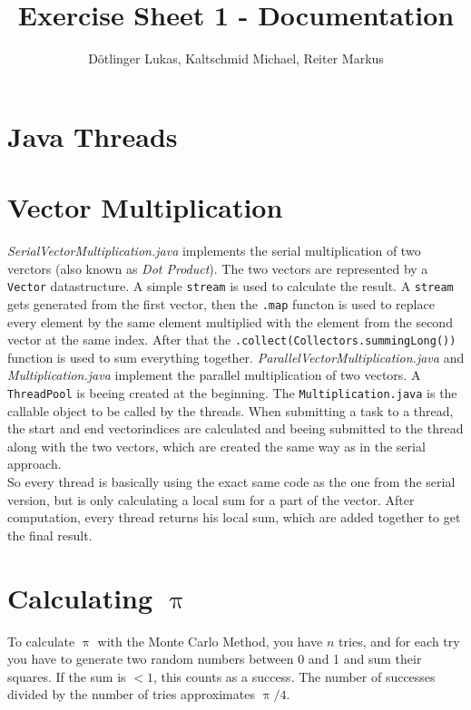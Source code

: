 \documentclass{article}
\begin{document}
	\title{Exercise Sheet 1 - Documentation}
	\date{}
	\author{Dötlinger Lukas, Kaltschmid Michael, Reiter Markus}

	\maketitle


	\section{Java Threads}


	\section{Vector Multiplication}
		\textit{SerialVectorMultiplication.java} implements the serial multiplication of two verctors (also known as \textit{Dot Product}). The two vectors are represented by a \texttt{Vector} datastructure. A simple \texttt{stream} is used to calculate the result. A \texttt{stream} gets generated from the first vector, then the \texttt{.map} functon is used to replace every element by the same element multiplied with the element from the second vector at the same index. After that the \texttt{.collect(Collectors.summingLong())} function is used to sum everything together.\bigbreak
		\textit{ParallelVectorMultiplication.java} and \textit{Multiplication.java} implement the parallel multiplication of two vectors. A \texttt{ThreadPool} is beeing created at the beginning. The \texttt{Multiplication.java} is the callable object to be called by the threads. When submitting a task to a thread, the start and end vectorindices are calculated and beeing submitted to the thread along with the two vectors, which are created the same way as in the serial approach.\\ 
		So every thread is basically using the exact same code as the one from the serial version, but is only calculating a local sum for a part of the vector.
		After computation, every thread returns his local sum, which are added together to get the final result.


  \section{Calculating $\uppi$}

  To calculate $\uppi$ with the Monte Carlo Method, you have $n$ tries, and for each try you have to generate two random numbers between 0 and 1 and sum their squares. If the sum is $< 1$, this counts as a success. The number of successes divided by the number of tries approximates $\uppi / 4$.
\end{document}
